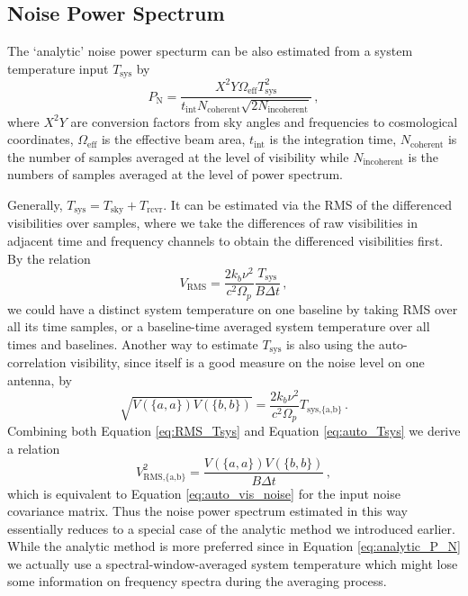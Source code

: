 \documentclass[12pt,a4paper]{article}
\begin{document}
\subsection{Noise Power Spectrum}
The `analytic' noise power specturm can be also estimated from a system temperature input $T_\text{sys}$ by  \citep{cheng2018characterizing,kern2020mitigating}
\begin{equation}
\label{eq:analytic_P_N}
    P_\text{N} = \frac{X^2 Y \Omega_\text{eff} T_\text{sys}^2}{t_\text{int} N_\text{coherent}\sqrt{2N_\text{incoherent}}}\,,
\end{equation}
where $X^2Y$ are conversion factors from sky angles and frequencies to cosmological coordinates, $\Omega_\text{eff}$ is the effective beam area, $t_\text{int}$ is the integration time, $N_\text{coherent}$ is the number of samples averaged at the level of visibility while $N_\text{incoherent}$ is the numbers of samples averaged at the level of power spectrum.

Generally, $T_\text{sys} = T_\text{sky} + T_\text{rcvr}$. It can be estimated via the RMS of the differenced visibilities over samples, where we take the differences of raw visibilities in adjacent time and frequency channels to obtain the differenced visibilities first. By the relation  
\begin{equation}
\label{eq:RMS_Tsys}
V_\text{RMS} = \frac{2k_b \nu^2}{c^2 \Omega_p}\frac{T_\text{sys}}{B \Delta t} \,,
\end{equation}
we could have a distinct system temperature on one baseline by taking RMS over all its time samples, or a baseline-time averaged system temperature over all times and baselines. Another way to estimate $T_\text{sys}$ is also using the auto-correlation visibility, since itself is a good measure on the noise level on one antenna, by
\begin{equation}
\label{eq:auto_Tsys}
\sqrt{V(\{a,a\}) V(\{b,b\})} = \frac{2k_b \nu^2}{c^2 \Omega_p} T_\text{sys,\{a,b\}}\,.
\end{equation}
Combining both Equation \ref{eq:RMS_Tsys} and Equation \ref{eq:auto_Tsys} we derive a relation
\begin{equation}
\label{eq:auto2RMS}
V^2_\text{RMS,\{a,b\}} = \frac{V(\{a,a\}) V(\{b,b\})}{B \Delta t}\,,
\end{equation}
which is equivalent to Equation \ref{eq:auto_vis_noise} for the input noise covariance matrix. Thus the noise power spectrum estimated in this way essentially reduces to a special case of the analytic method we introduced earlier. While the analytic method is more preferred since in Equation \ref{eq:analytic_P_N} we actually use a spectral-window-averaged system temperature which might lose some information on frequency spectra during the averaging process.   

 
\end{document}
